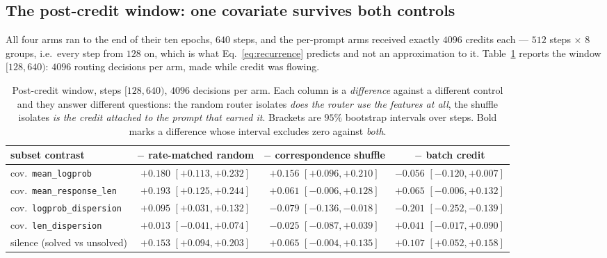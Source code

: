 \subsection{The post-credit window: one covariate survives both controls}
\label{sec:m8post}

All four arms ran to the end of their ten epochs, $640$ steps, and the per-prompt arms received
exactly $4096$ credits each --- $512$ steps $\times$ $8$ groups, i.e.\ every step from $128$ on,
which is what Eq.~\ref{eq:recurrence} predicts and not an approximation to it.
Table~\ref{tab:m8post} reports the window $[128,640)$: $4096$ routing decisions per arm, made
while credit was flowing.

\begin{table}[t]
\centering\small
\caption{Post-credit window, steps $[128,640)$, $4096$ decisions per arm. Each column is a
\emph{difference} against a different control and they answer different questions: the random
router isolates \emph{does the router use the features at all}, the shuffle isolates \emph{is
the credit attached to the prompt that earned it}. Brackets are $95\%$ bootstrap intervals over
steps. Bold marks a difference whose interval excludes zero against \emph{both}.}
\label{tab:m8post}
\begin{tabular}{lccc}
\toprule
subset contrast & $-$ rate-matched random & $-$ correspondence shuffle & $-$ batch credit \\
\midrule
cov.\ \texttt{mean\_logprob}       & $\mathbf{+0.180}$ $[+0.113,+0.232]$ & $\mathbf{+0.156}$ $[+0.096,+0.210]$ & $-0.056$ $[-0.120,+0.007]$ \\
cov.\ \texttt{mean\_response\_len} & $+0.193$ $[+0.125,+0.244]$ & $+0.061$ $[-0.006,+0.128]$ & $+0.065$ $[-0.006,+0.132]$ \\
cov.\ \texttt{logprob\_dispersion} & $+0.095$ $[+0.031,+0.132]$ & $-0.079$ $[-0.136,-0.018]$ & $-0.201$ $[-0.252,-0.139]$ \\
cov.\ \texttt{len\_dispersion}     & $+0.013$ $[-0.041,+0.074]$ & $-0.025$ $[-0.087,+0.039]$ & $+0.041$ $[-0.017,+0.090]$ \\
silence (solved vs unsolved)       & $+0.153$ $[+0.094,+0.203]$ & $+0.065$ $[-0.004,+0.135]$ & $+0.107$ $[+0.052,+0.158]$ \\
\bottomrule
\end{tabular}
\end{table}

